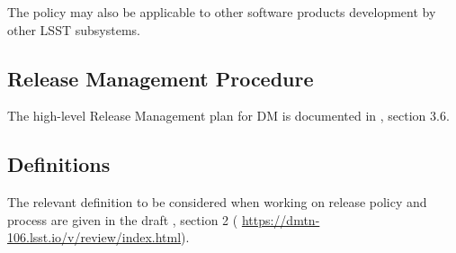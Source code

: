 The policy may also be applicable to other software products development by other \gls{LSST} subsystems.


\subsection{Release Management Procedure} \label{sec:rmproc}

The high-level \gls{Release} Management plan for \gls{DM} is documented in , section 3.6. 


\subsection{Definitions} \label{sec:defs}

The relevant definition to be considered when working on release policy and process are given in the draft , section 2 ( \url{https://dmtn-106.lsst.io/v/review/index.html}).
